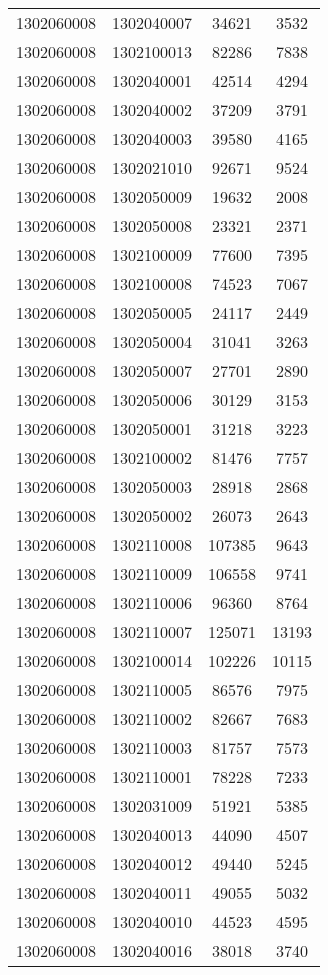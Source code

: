 \begin{longtable}{llcc}
1302060008 & 1302040007 & 34621 & 3532\\
1302060008 & 1302100013 & 82286 & 7838\\
1302060008 & 1302040001 & 42514 & 4294\\
1302060008 & 1302040002 & 37209 & 3791\\
1302060008 & 1302040003 & 39580 & 4165\\
1302060008 & 1302021010 & 92671 & 9524\\
1302060008 & 1302050009 & 19632 & 2008\\
1302060008 & 1302050008 & 23321 & 2371\\
1302060008 & 1302100009 & 77600 & 7395\\
1302060008 & 1302100008 & 74523 & 7067\\
1302060008 & 1302050005 & 24117 & 2449\\
1302060008 & 1302050004 & 31041 & 3263\\
1302060008 & 1302050007 & 27701 & 2890\\
1302060008 & 1302050006 & 30129 & 3153\\
1302060008 & 1302050001 & 31218 & 3223\\
1302060008 & 1302100002 & 81476 & 7757\\
1302060008 & 1302050003 & 28918 & 2868\\
1302060008 & 1302050002 & 26073 & 2643\\
1302060008 & 1302110008 & 107385 & 9643\\
1302060008 & 1302110009 & 106558 & 9741\\
1302060008 & 1302110006 & 96360 & 8764\\
1302060008 & 1302110007 & 125071 & 13193\\
1302060008 & 1302100014 & 102226 & 10115\\
1302060008 & 1302110005 & 86576 & 7975\\
1302060008 & 1302110002 & 82667 & 7683\\
1302060008 & 1302110003 & 81757 & 7573\\
1302060008 & 1302110001 & 78228 & 7233\\
1302060008 & 1302031009 & 51921 & 5385\\
1302060008 & 1302040013 & 44090 & 4507\\
1302060008 & 1302040012 & 49440 & 5245\\
1302060008 & 1302040011 & 49055 & 5032\\
1302060008 & 1302040010 & 44523 & 4595\\
1302060008 & 1302040016 & 38018 & 3740\\

\end{longtable}

